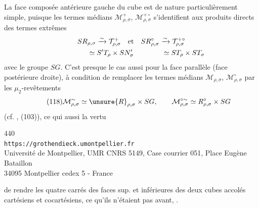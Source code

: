 La face composée antérieure gauche du cube est de nature particulièrement simple, puisque les termes médians $\mathcal M_{\rho,\sigma}^{+}$, $\mathcal M_{\rho,\sigma}^{+\circ}$ s'identifient  aux produits directs des termes extrêmes
\[
\begin{gathered}
SR_{\rho,\sigma}\xrightarrow{\sim}\mathcal T_{\rho,\sigma}^{+}
\quad\text{et}\quad
SR_{\rho,\sigma}^{\circ}\xrightarrow{\sim}\mathcal T_{\rho,\sigma}^{+\circ}\\
\hphantom{SR_{\rho,\sigma}\xrightarrow{\sim}}\simeq S'T_\rho\times SN'_\sigma
\qquad\qquad\simeq ST_\rho\times ST_\sigma
\end{gathered}
\]
avec le groupe $SG$. C'est presque le cas aussi pour la face parallèle (face postérieure droite),  à condition de remplacer les  termes médians $\mathcal M_{\rho,\sigma}$, $\mathcal M_{\rho,\sigma}^{\circ}$ par les $\mu_2$-revêtements
\[
\tag{118}
\mathcal M_{\rho,\sigma}^{\sim}\simeq\unsure{R}_{\rho,\sigma}\times SG,
\qquad \mathcal M_{\rho,\sigma}^{\circ\sim}\simeq R_{\rho,\sigma}^{\circ}\times SG
\]
(cf. , (103)), ce qui  aussi la vertu


\begin{center}
{\small
440\\
\texttt{https://grothendieck.umontpellier.fr}\\
Université de Montpellier, UMR CNRS 5149, Case courrier 051, Place Eugène Bataillon\\
34095 Montpellier cedex 5 - France
}
\end{center}


 de rendre les quatre carrés des faces sup. et inférieures des deux cubes accolés cartésiens et cocartésiens, ce qu'ils n'étaient pas avant, .

